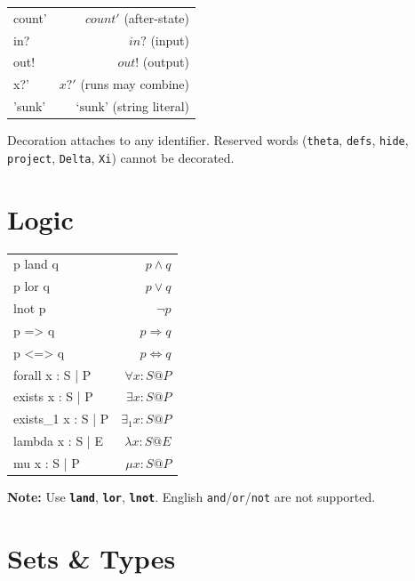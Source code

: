 \documentclass[10pt,landscape,a4paper]{article}
\newcommand{\kw}[1]{\texttt{\bfseries #1}}
\begin{document}
\begin{multicols}{3}
\begin{tabularx}{\columnwidth}{LR}
count'               & $count'$ (after-state) \\
in?                  & $in?$ (input) \\
out!                 & $out!$ (output) \\
x?'                  & $x?'$ (runs may combine) \\
'sunk'               & $\mbox{`sunk'}$ (string literal) \\
\end{tabularx}

{\footnotesize Decoration attaches to any identifier. Reserved words (\texttt{theta}, \texttt{defs}, \texttt{hide}, \texttt{project}, \texttt{Delta}, \texttt{Xi}) cannot be decorated.}

\section{Logic}

\begin{tabularx}{\columnwidth}{LR}
p land q             & $p \land q$ \\
p lor q              & $p \lor q$ \\
lnot p               & $\lnot p$ \\
p => q               & $p \Rightarrow q$ \\
p <=> q              & $p \Leftrightarrow q$ \\
forall x : S | P     & $\forall x : S @ P$ \\
exists x : S | P     & $\exists x : S @ P$ \\
exists\_1 x : S | P  & $\exists_1 x : S @ P$ \\
lambda x : S | E     & $\lambda x : S @ E$ \\
mu x : S | P         & $\mu x : S @ P$ \\
\end{tabularx}

\smallskip
{\footnotesize\textbf{Note:} Use \kw{land}, \kw{lor}, \kw{lnot}. English \texttt{and}/\texttt{or}/\texttt{not} are not supported.}

\section{Sets \& Types}


\end{multicols}
\end{document}
